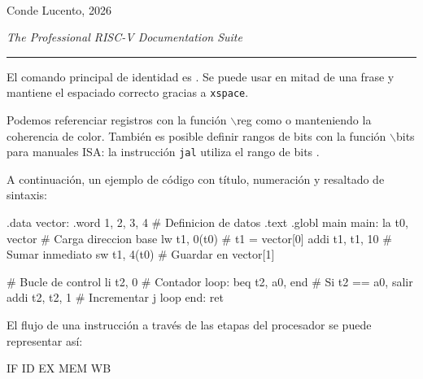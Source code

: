 \documentclass[11pt,a4paper]{article}
\begin{document}
\begin{center}
    \Huge \RiScVTeX \\ \par \vspace{2mm}
     \normalsize Conde Lucento, 2026 \par \vspace{4mm}
    \large \textit{The Professional RISC-V Documentation Suite}
\end{center}

\listofcodes 
\par
\vspace{4mm}
\hrule
\par
\vspace{4mm}
El comando principal de identidad es \RiScVTeX. Se puede usar en mitad de una frase y mantiene el espaciado correcto gracias a \texttt{xspace}. 

Podemos referenciar registros con la función \(\backslash\)reg como  o  manteniendo la coherencia de color. También es posible definir rangos de bits con la función \(\backslash\)bits para manuales ISA: la instrucción \texttt{jal} utiliza el rango de bits .

A continuación, un ejemplo de código con título, numeración y resaltado de sintaxis:

\begin{riscv}
.data
    vector: .word 1, 2, 3, 4 # Definicion de datos
.text
.globl main
main:
    la   t0, vector     # Carga direccion base
    lw   t1, 0(t0)      # t1 = vector[0]
    addi t1, t1, 10     # Sumar inmediato
    sw   t1, 4(t0)      # Guardar en vector[1]
    
    # Bucle de control
    li   t2, 0          # Contador
loop:
    beq  t2, a0, end    # Si t2 == a0, salir
    addi t2, t2, 1      # Incrementar
    j    loop
end:
    ret
\end{riscv}

\newpage 

El flujo de una instrucción a través de las etapas del procesador se puede representar así:
\begin{center}
    IF \riscvstep ID \riscvstep EX \riscvstep MEM \riscvstep WB
\end{center}
\end{document}
